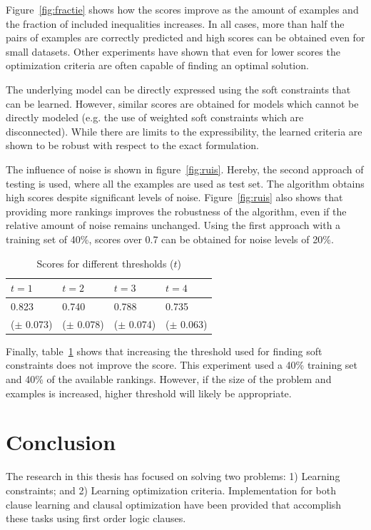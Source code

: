 \documentclass[letterpaper]{article}
\theoremstyle{definition}
\begin{document}
Figure~\ref{fig:fractie} shows how the scores improve as the amount of examples and the fraction of included inequalities increases.
In all cases, more than half the pairs of examples are correctly predicted and high scores can be obtained even for small datasets.
Other experiments have shown that even for lower scores the optimization criteria are often capable of finding an optimal solution.

The underlying model can be directly expressed using the soft constraints that can be learned.
However, similar scores are obtained for models which cannot be directly modeled (e.g. the use of weighted soft constraints which are disconnected).
While there are limits to the expressibility, the learned criteria are shown to be robust with respect to the exact formulation.

The influence of noise is shown in figure~\ref{fig:ruis}.
Hereby, the second approach of testing is used, where all the examples are used as test set.
The algorithm obtains high scores despite significant levels of noise.
Figure~\ref{fig:ruis} also shows that providing more rankings improves the robustness of the algorithm, even if the relative amount of noise remains unchanged.
Using the first approach with a training set of 40\%, scores over 0.7 can be obtained for noise levels of 20\%.

  \begin{table}
    \caption{Scores for different thresholds ($t$)}
    \begin{tabularx}{\linewidth}{XXXX}
      $t = 1$ & $t = 2$ & $t = 3$ & $t = 4$ \\
      \toprule
     0.823 & 0.740 & 0.788 & 0.735 \\
     ($\pm$ 0.073)&
($\pm$ 0.078)&
($\pm$ 0.074)&
($\pm$ 0.063)
    \end{tabularx}
    \label{tbl:limiet}
  \end{table}

Finally, table~\ref{tbl:limiet} shows that increasing the threshold used for finding soft constraints does not improve the score.
This experiment used a 40\% training set and 40\% of the available rankings.
However, if the size of the problem and examples is increased, higher threshold will likely be appropriate.

\section{Conclusion}
The research in this thesis has focused on solving two problems: 1) Learning constraints; and 2) Learning optimization criteria.
Implementation for both clause learning and clausal optimization have been provided that accomplish these tasks using first order logic clauses.
\end{document}
